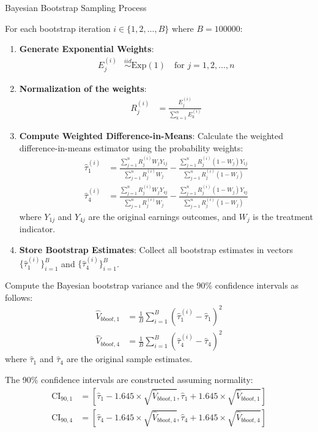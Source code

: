 \documentclass[11pt]{article}
\numberwithin{equation}{section}
\begin{document}
\begin{algorithm}
    \caption{Bayesian Bootstrap Sampling Process}
    \label{alg:bayesian_bootstrap_sampling_process}
    For each bootstrap iteration $i \in \{1, 2, \ldots, B\}$ where $B = 100000$:
    \begin{enumerate}
        \item \textbf{Generate Exponential Weights}: 
        \begin{align}
            E^{(i)}_j &\overset{iid}{\sim} \text{Exp}(1) \quad \text{for } j = 1, 2, \ldots, n
        \end{align}
        
        \item \textbf{Normalization of the weights}:
        \begin{align}
            R^{(i)}_j &= \frac{E^{(i)}_j}{\sum_{k=1}^n E^{(i)}_k}
        \end{align}
        

        \item \textbf{Compute Weighted Difference-in-Means}: Calculate the weighted difference-in-means estimator using the probability weights:
        \begin{align}
            \hat{\tau}^{(i)}_1 &= \frac{\sum_{j=1}^n R^{(i)}_j W_j Y_{1j}}{\sum_{j=1}^n R^{(i)}_j W_j} - \frac{\sum_{j=1}^n R^{(i)}_j (1-W_j) Y_{1j}}{\sum_{j=1}^n R^{(i)}_j (1-W_j)} \\
            \hat{\tau}^{(i)}_4 &= \frac{\sum_{j=1}^n R^{(i)}_j W_j Y_{4j}}{\sum_{j=1}^n R^{(i)}_j W_j} - \frac{\sum_{j=1}^n R^{(i)}_j (1-W_j) Y_{4j}}{\sum_{j=1}^n R^{(i)}_j (1-W_j)}
        \end{align}
        where $Y_{1j}$ and $Y_{4j}$ are the original earnings outcomes, and $W_j$ is the treatment indicator.
        
        \item \textbf{Store Bootstrap Estimates}: Collect all bootstrap estimates in vectors $\{\hat{\tau}^{(i)}_1\}_{i=1}^B$ and $\{\hat{\tau}^{(i)}_4\}_{i=1}^B$.
    \end{enumerate}
    
    Compute the Bayesian bootstrap variance and the 90\% confidence intervals as follows:
    \begin{align}
        \hat{V}_{bboot,1} &= \frac{1}{B} \sum_{i=1}^B \left(\hat{\tau}^{(i)}_1 - \hat{\tau}_1\right)^2 \\
        \hat{V}_{bboot,4} &= \frac{1}{B} \sum_{i=1}^B \left(\hat{\tau}^{(i)}_4 - \hat{\tau}_4\right)^2
    \end{align}
    where $\hat{\tau}_1$ and $\hat{\tau}_4$ are the original sample estimates.
    
    The 90\% confidence intervals are constructed assuming normality:
    \begin{align}
        \text{CI}_{90,1} &= \left[\hat{\tau}_1 - 1.645 \times \sqrt{\hat{V}_{bboot,1}}, \hat{\tau}_1 + 1.645 \times \sqrt{\hat{V}_{bboot,1}}\right] \\
        \text{CI}_{90,4} &= \left[\hat{\tau}_4 - 1.645 \times \sqrt{\hat{V}_{bboot,4}}, \hat{\tau}_4 + 1.645 \times \sqrt{\hat{V}_{bboot,4}}\right]
    \end{align}
\end{algorithm}
\end{document}
